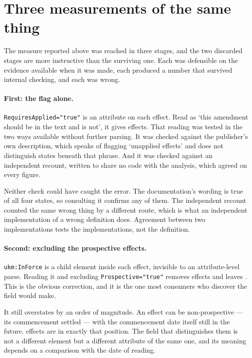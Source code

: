 \documentclass[11pt]{article}
\begin{document}
\section{Three measurements of the same thing}

The measure reported above was reached in three stages, and the two discarded
stages are more instructive than the surviving one. Each was defensible on the
evidence available when it was made, each produced a number that survived
internal checking, and each was wrong.

\paragraph{First: the flag alone.} \texttt{RequiresApplied="true"} is an
attribute on each effect. Read as `this amendment should be in the text and is
not', it gives \nFlagged{} effects. That reading was tested in the two ways
available without further parsing. It was checked against the publisher's own
description, which speaks of flagging `unapplied effects' and does not
distinguish states beneath that phrase. And it was checked against an
independent recount, written to share no code with the analysis, which agreed
on every figure.

Neither check could have caught the error. The documentation's wording is true
of all four states, so consulting it confirms any of them. The independent
recount counted the same wrong thing by a different route, which is what an
independent implementation of a wrong definition does. Agreement between two
implementations tests the implementations, not the definition.

\paragraph{Second: excluding the prospective effects.} \texttt{ukm:InForce} is
a child element inside each effect, invisible to an attribute-level parse.
Reading it and excluding \texttt{Prospective="true"} removes \nProspective{}
effects and leaves \nEffectsSecondPass{}. This is the obvious correction, and it
is the one most consumers who discover the field would make.

It still overstates by an order of magnitude. An effect can be
non-prospective --- its commencement settled --- with the commencement date
itself still in the future. \nScheduled{} effects are in exactly that position.
The field that distinguishes them is not a different element but a different
attribute of the same one, and its meaning depends on a comparison with the
date of reading.
\end{document}
